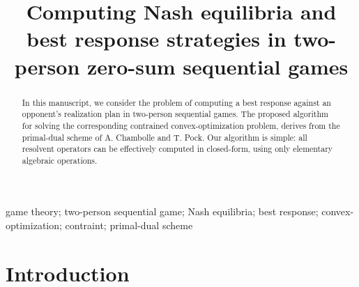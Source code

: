 \documentclass[a4paper,9pt,journal]{IEEEtran}
\begin{document}
\onecolumn
\title{Computing Nash equilibria and best response strategies in two-person zero-sum sequential games}


\author{}


\maketitle

\begin{abstract}
% 
In this manuscript, we consider the problem of computing a best response against an opponent's realization plan in two-person sequential games.
The proposed algorithm for solving the corresponding contrained convex-optimization problem, derives from the primal-dual scheme of A. Chambolle and T. Pock.
Our algorithm is simple: all resolvent operators can be effectively computed in closed-form, using only elementary algebraic operations.
\end{abstract}


\begin{IEEEkeywords}
  game theory; two-person sequential game; Nash equilibria; best response; convex-optimization; contraint; primal-dual scheme
\end{IEEEkeywords}

\section{Introduction}
\end{document}
